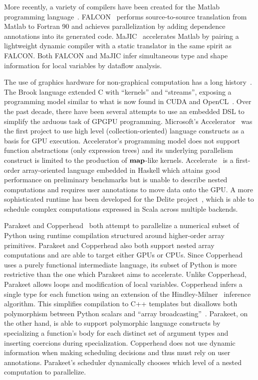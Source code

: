 \documentclass[10pt,twocolumn]{article}
\begin{document}
More recently, a variety of compilers have been created for the Matlab programming language~\cite{Moler80}. FALCON~\cite{DeRose95} performs source-to-source translation from Matlab to Fortran 90 and achieves parallelization by adding dependence annotations into its generated code. MaJIC~\cite{Alma02} accelerates Matlab by pairing a lightweight dynamic compiler with a static translator in the same spirit as FALCON. Both FALCON and MaJIC infer simultaneous type and shape information for local variables by dataflow analysis.

The use of graphics hardware for non-graphical computation has a long history~\cite{Leng90}. The Brook language extended C with ``kernels'' and ``streams'', exposing a programming model similar to what is now found in CUDA and OpenCL~\cite{Buck04}.  Over the past decade, there have been several attempts to use an embedded DSL to simplify the arduous task of GPGPU programming. Microsoft's Accelerator~\cite{Tard06} was the first project to use high level (collection-oriented) language constructs as a basis for GPU execution. Accelerator's programming model does not support function abstractions (only expression trees) and its underlying parallelism construct is limited to the production of $\mbox{\textbf{map}}$-like kernels.  Accelerate~\cite{Chak11} is a first-order array-oriented language embedded in Haskell which attains good performance on preliminary benchmarks but is unable to describe nested computations and requires user annotations to move data onto the GPU. A more sophisticated runtime has been developed for 
the Delite project~\cite{Brown11}, which is able to schedule complex computations expressed in Scala across multiple backends. 

Parakeet and Copperhead~\cite{Cata11} both attempt to parallelize a numerical subset of Python using runtime compilation structured around higher-order array primitives. Parakeet and Copperhead also both support nested array computations and are able to target either GPUs or CPUs. Since Copperhead uses a purely functional intermediate language, its subset of Python is more restrictive than the one which Parakeet aims to accelerate. Unlike Copperhead, Parakeet allows loops and  modification of local variables. Copperhead infers a single type for each function using an extension of the Hindley-Milner~\cite{Damas82} inference algorithm. This simplifies compilation to C++ templates but disallows both polymorphism between Python scalars and ``array broadcasting''~\cite{Oliphant07}. Parakeet, on the other hand, is able to support polymorphic language constructs by specializing a function's body for each distinct set of argument types and inserting coercions during specialization. Copperhead does not use dynamic information when making scheduling decisions and thus must rely on user annotations. Parakeet's scheduler dynamically chooses which level of a nested computation to parallelize. 
\end{document}
